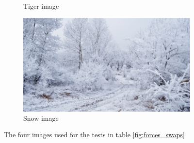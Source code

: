 \begin{figure}[H]
\begin{subfigure}[b]{0.33\textwidth}
            \caption{Tiger image \\\citep{imgTiger}}
    \end{subfigure}
    \begin{subfigure}[b]{0.33\textwidth}
            \includegraphics[width=\textwidth]{figures/snow}
            \caption{Snow image \\\citep{imgSnow}}
    \end{subfigure}
    \caption{The four images used for the tests in table \ref{fig:forces_swaps}}
    \label{fig:four_test_images}
\end{figure}

